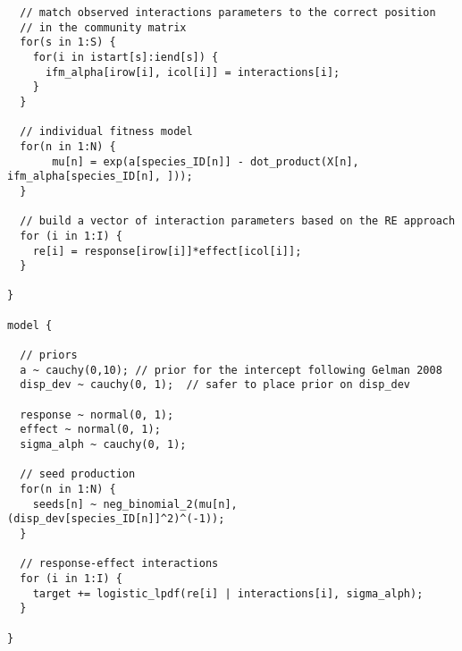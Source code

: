 \documentclass[a4,12pt]{article}
\begin{document}
\begin{lstlisting}
  // match observed interactions parameters to the correct position 
  // in the community matrix
  for(s in 1:S) {
    for(i in istart[s]:iend[s]) {
      ifm_alpha[irow[i], icol[i]] = interactions[i];
    }
  }
  
  // individual fitness model 
  for(n in 1:N) {
       mu[n] = exp(a[species_ID[n]] - dot_product(X[n], ifm_alpha[species_ID[n], ]));  
  }
  
  // build a vector of interaction parameters based on the RE approach
  for (i in 1:I) {
    re[i] = response[irow[i]]*effect[icol[i]];
  }
  
} 

model {

  // priors
  a ~ cauchy(0,10); // prior for the intercept following Gelman 2008
  disp_dev ~ cauchy(0, 1);  // safer to place prior on disp_dev
  
  response ~ normal(0, 1);   
  effect ~ normal(0, 1);
  sigma_alph ~ cauchy(0, 1);

  // seed production 
  for(n in 1:N) {
    seeds[n] ~ neg_binomial_2(mu[n], (disp_dev[species_ID[n]]^2)^(-1));
  }

  // response-effect interactions
  for (i in 1:I) {
    target += logistic_lpdf(re[i] | interactions[i], sigma_alph);
  }
  
} 



        \end{lstlisting}
\end{document}
